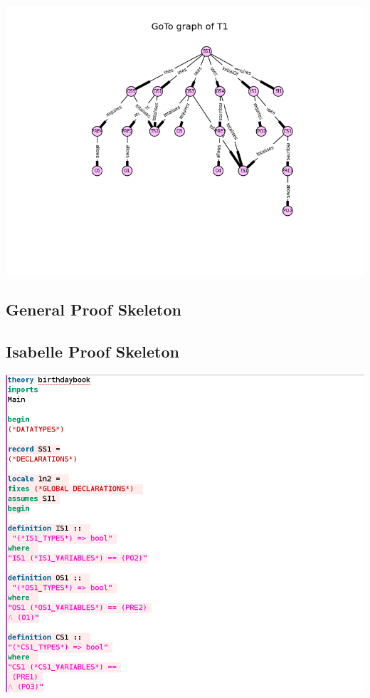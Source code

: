 \includegraphics[scale=0.7]{examples/bb/25b.png}
\subsection{General Proof Skeleton}
\label{app:bb3}

\subsection{Isabelle Proof Skeleton}
\label{app:bb4}
\includegraphics[scale=0.5]{examples/bb/4imagea.png}

